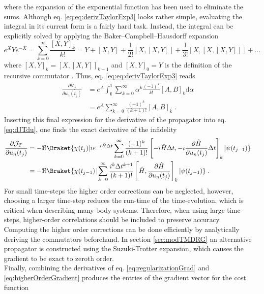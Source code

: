 where the expansion of the exponential function has been used to eliminate the sums. Although eq. \eqref{eq:eq:derivTaylorExp3} looks rather simple, evaluating the integral in its current form is a fairly hard task. Instead, the integral can be explicitly solved by applying the Baker–Campbell–Hausdorff expansion 
\begin{equation}
	e^X Y e^{-X} = \sum_{k = 0}^{\infty} \frac{ [ X,Y  ]_k }{k!} = Y + [ X,Y  ] + \frac{1}{2!} [ X , [ X,Y  ]] + \frac{1}{3!} [X, [ X , [ X,Y  ]]  ] + ...
\end{equation}
where $[ X , Y ]_k = [ X ,[ X , Y]]_{k-1}$ and $[X,Y]_0 = Y$ is the definition of the recursive commutator \cite{Wilcox1967}. Thus, eq. \eqref{eq:eq:derivTaylorExp3} reads
\begin{align}
	\frac{\partial \hat{\mathcal{U}}_{j}}{\partial u_n (t_j)} &=  e^A \int_{0}^{1} \sum_{k = 0}^{\infty } \alpha^{k} \frac{(-1)^k}{k!} [ A,B  ]_k \mathrm{d}\alpha \nonumber \\
	&= e^A  \sum_{k = 0}^{\infty }  \frac{(-1)^k}{(k+1)!} [ A,B  ]_k \; .
\end{align}
Inserting this final expression for the derivative of the propagator into eq. \eqref{eq:dJTdu}, one finds the exact derivative of the infidelity 
\begin{align}
\frac{\partial \mathcal{J}_T}{\partial u_n (t_j)} &=  - \Re  \Braket{\chi (t_j) | i e^{-i \hat{H} \Delta t}  \sum_{k = 0}^{\infty }  \frac{(-1)^k}{(k+1)!} \left[ -i \hat{H} \Delta t , -i \frac{\partial \hat{H}}{\partial u_n (t_j)} \Delta t  \right]_k | \psi (t_{j-1})}  \nonumber \\
	&=  - \Re  \Braket{\chi (t_{j-1}) | \sum_{k = 0}^{\infty }  \frac{i^{k} \Delta t^{k+1}}{(k+1)!} \left[ \hat{H} , \frac{\partial \hat{H}}{\partial u_n (t_j)}  \right]_k | \psi (t_{j-1})}  \; . \label{eq:higherOrderGradient}
\end{align}
For small time-steps the higher order corrections can be neglected, however, choosing a larger time-step reduces the run-time of the time-evolution, which is critical when describing many-body systems. Therefore, when using large time-steps, higher-order correlations should be included to preserve accuracy. Computing the higher order corrections can be done efficiently by analytically deriving the commutators beforehand. In section \ref{sec:modTMDRG} an alternative propagator is constructed using the Suzuki-Trotter expansion, which causes the gradient to be exact to zeroth order.\\
Finally, combining the derivatives of eq. \eqref{eq:regularizationGrad} and \eqref{eq:higherOrderGradient} produces the entries of the gradient vector for the cost function
